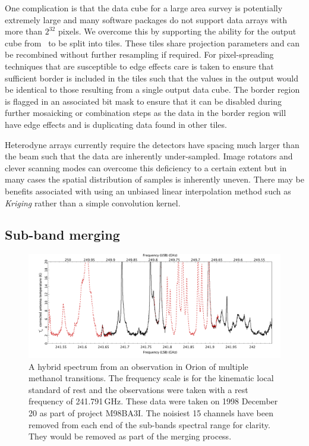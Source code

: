 \documentclass[final,authoryear,5p,times,twocolumn]{elsarticle}
\begin{document}
One complication is that the data cube for a large area survey is
potentially extremely large and many software packages do not support
data arrays with more than $2^{32}$ pixels. We overcome this by
supporting the ability for the output cube from \makecube\ to
be split into tiles. These tiles share projection parameters and can
be recombined without further resampling if required. For
pixel-spreading techniques that are susceptible to edge effects care is
taken to ensure that sufficient border is included in the tiles such
that the values in the output would be identical to those resulting
from a single output data cube. The border region is flagged in an
associated bit mask to ensure that it can be disabled during further
mosaicking or combination steps as the data in the border region will
have edge effects and is duplicating data found in other tiles.

Heterodyne arrays currently require the detectors have spacing much
larger than the beam such that the data are inherently
under-sampled. Image rotators and clever scanning modes can overcome
this deficiency to a certain extent but in many cases the spatial
distribution of samples is inherently uneven. There may be benefits
associated with using an unbiased linear interpolation method such as
\emph{Kriging} \citep[e.g.][]{1990Cressie} rather than a simple
convolution kernel.

\subsection{Sub-band merging}

\begin{figure}[t]
\begin{minipage}{\textwidth}
\includegraphics[width=\textwidth]{hybrid}
\caption{A hybrid spectrum from an observation in Orion of multiple
  methanol transitions. The frequency scale is for the kinematic local
  standard of rest and the observations were taken with a rest
  frequency of 241.791\,GHz. These data were taken on 1998 December 20
  as part of project M98BA3I. The noisiest 15 channels have been
  removed from each end of the sub-bands spectral range for
  clarity. They would be removed as part of the merging process.}
\label{fig:hybrid}
\end{minipage}
\end{figure}
\end{document}
